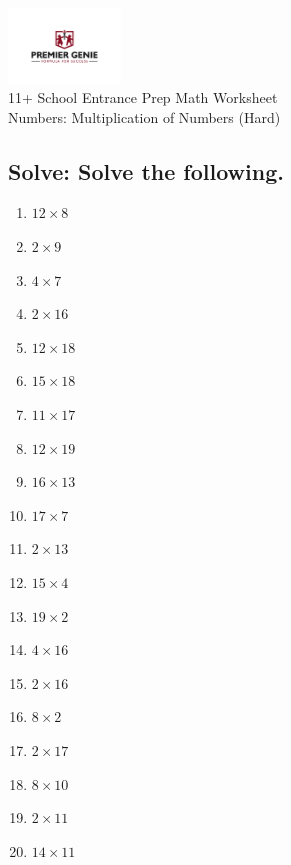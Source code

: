 \documentclass{article}
\begin{document}
\begin{center}
\includegraphics[width=3cm]{PREMGENIEJPG.jpg}\\
{\Large 11+ School Entrance Prep Math Worksheet}\\
{\Medium Numbers: Multiplication of Numbers (Hard)}\\

\end{center}

\subsection*{Solve: Solve the following.}

\begin{enumerate}
\item $\displaystyle {12}\times{8} $ \ 
\item $\displaystyle {2}\times{9} $ \ 
\item $\displaystyle {4}\times{7} $ \ 
\item $\displaystyle {2}\times{16} $ \ 
\item $\displaystyle {12}\times{18} $ \ 
\item $\displaystyle {15}\times{18} $ \ 
\item $\displaystyle {11}\times{17} $ \ 
\item $\displaystyle {12}\times{19} $ \ 
\item $\displaystyle {16}\times{13} $ \ 
\item $\displaystyle {17}\times{7} $ \ 
\item $\displaystyle {2}\times{13} $ \ 
\item $\displaystyle {15}\times{4} $ \ 
\item $\displaystyle {19}\times{2} $ \ 
\item $\displaystyle {4}\times{16} $ \ 
\item $\displaystyle {2}\times{16} $ \ 
\item $\displaystyle {8}\times{2} $ \ 
\item $\displaystyle {2}\times{17} $ \ 
\item $\displaystyle {8}\times{10} $ \ 
\item $\displaystyle {2}\times{11} $ \ 
\item $\displaystyle {14}\times{11} $ \ 


\end{enumerate}
\end{document}
